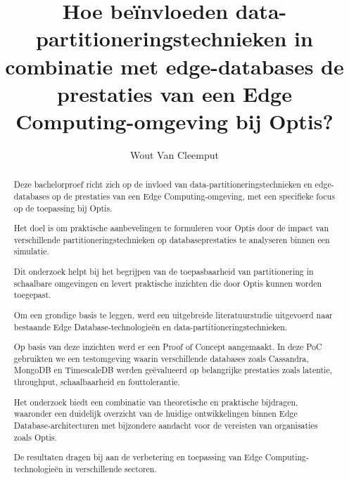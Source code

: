 \documentclass[a0,portrait]{hogent-poster}
\title{Hoe beïnvloeden data-partitioneringstechnieken in combinatie met edge-databases de prestaties van een Edge Computing-omgeving bij Optis?}
\author{Wout Van Cleemput}
\begin{document}
\maketitle

\begin{abstract}
  Deze bachelorproef richt zich op de invloed van data-partitioneringstechnieken en edge-databases op de prestaties van een Edge Computing-omgeving, met een specifieke focus op de toepassing bij Optis.

  Het doel is om praktische aanbevelingen te formuleren voor Optis door de impact van verschillende partitioneringstechnieken op databaseprestaties te analyseren binnen een simulatie. 
  
  Dit onderzoek helpt bij het begrijpen van de toepasbaarheid van partitionering in schaalbare omgevingen en levert praktische inzichten die door Optis kunnen worden toegepast.
  
  Om een grondige basis te leggen, werd een uitgebreide literatuurstudie uitgevoerd naar bestaande Edge Database-technologieën en data-partitioneringstechnieken.
  
  Op basis van deze inzichten werd er een Proof of Concept aangemaakt. In deze PoC gebruikten we een testomgeving waarin verschillende databases zoals Cassandra, MongoDB en TimescaleDB werden geëvalueerd op belangrijke prestaties zoals latentie, throughput, schaalbaarheid en fouttolerantie.
  
  Het onderzoek biedt een combinatie van theoretische en praktische bijdragen, waaronder een duidelijk overzicht van de huidige ontwikkelingen binnen Edge Database-architecturen met bijzondere aandacht voor de vereisten van organisaties zoals Optis.
  
  De resultaten dragen bij aan de verbetering en toepassing van Edge Computing-technologieën in verschillende sectoren.
\end{abstract}
\end{document}
